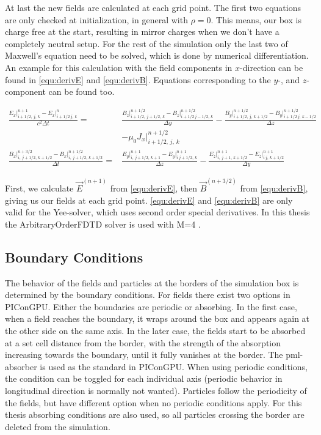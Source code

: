 \documentclass[bachelor_thesis]{subfiles}
\begin{document}
At last the new fields are calculated at each grid point. The first two equations are only checked at initialization, in general with $\rho=0$. This means, our box is charge free at the start, resulting in mirror charges when we don't have a completely neutral setup.
For the rest of the simulation only the last two of Maxwell's equation need to be solved, which is done by numerical differentiation. 
An example for this calculation with the field components in $x$-direction can be found in \autoref{equ:derivE} and \autoref{equ:derivB}. Equations corresponding to the $y$-, and $z$-component can be found too.

\begin{align}
	\frac{{E}_x\rvert_{i+1/2,\, j,\, k}^{n+1} - {E}_x\rvert_{i+1/2\, j,\, k}^{n}}{c^2\Delta t}
	=& \frac{{B}_z\rvert_{i+1/2,\, j+1/2,\, k}^{n+1/2} - {B}_z\rvert_{i+1/2\, j-1/2,\, k}^{n+1/2}}{\Delta y}
	- \frac{{B}_y\rvert_{i+1/2,\, j,\, k+1/2}^{n+1/2} - {B}_y\rvert_{i+1/2\, j,\, k-1/2}^{n+1/2}}{\Delta z}
	\label{equ:derivE}	\\&
	-\mu_0 J_x \rvert_{i+1/2,\, j,\, k}^{n+1/2}											\nonumber	\\
	 \frac{{B}_x\rvert_{i,\, j+1/2,\, k+1/2}^{n+3/2} - {B}_x\rvert_{i,\, j+1/2,\, k+1/2}^{n+1/2}}{\Delta t} 
	 =& \frac{{E}_y\rvert_{i,\, j+1/2,\, k+1}^{n+1} - {E}_y\rvert_{i\, j+1/2,\, k}^{n+1}}{\Delta z}
	- \frac{{E}_z\rvert_{i,\, j+1,\, k+1/2}^{n+1} - {E}_z\rvert_{i\, j,\, k+1/2}^{n+1}}{\Delta y}
	\label{equ:derivB}
\end{align}

First, we calculate $\vec{E}^{(n+1)}$ from \autoref{equ:derivE}, then $\vec{B}^{(n+3/2)}$ from \autoref{equ:derivB}, giving us our fields at each grid point. \autoref{equ:derivE} and \autoref{equ:derivB} are only valid for the Yee-solver, which uses second order special derivatives.
In this thesis the ArbitraryOrderFDTD solver is used with M=4 .


\subsection{Boundary Conditions}
The behavior of the fields and particles at the borders of the simulation box is determined by the boundary conditions.
For fields there exist two options in PIConGPU. Either the boundaries are periodic or absorbing. In the first case, when a field reaches the boundary, it wraps around the box and appears again at the other side on the same axis.
In the later case, the fields start to be absorbed at a set cell distance from the border, with the strength of the absorption increasing towards the boundary, until it fully vanishes at the border.
The \gls{pml}-absorber is used as the standard in PIConGPU. When using periodic conditions, the condition can be toggled for each individual axis (periodic behavior in longitudinal direction is normally not wanted).
Particles follow the periodicity of the fields, but have different option when no periodic conditions apply. For this thesis absorbing conditions are also used, so all particles crossing the border are deleted from the simulation.
\end{document}

